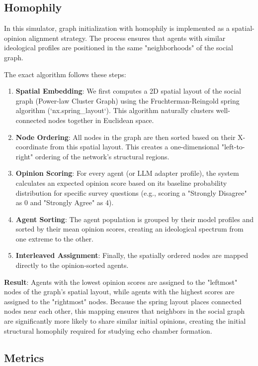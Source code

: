 \documentclass{article} %
\begin{document}
\subsection{Homophily}
\label{appendix_homophily}

In this simulator, graph initialization with homophily is implemented as a spatial-opinion alignment strategy. The process ensures that agents with similar ideological profiles are positioned in the same "neighborhoods" of the social graph.

The exact algorithm follows these steps:

\begin{enumerate}
    \item \textbf{Spatial Embedding}: We first computes a 2D spatial layout of the social graph (Power-law Cluster Graph) using the Fruchterman-Reingold spring algorithm (`nx.spring\_layout`). This algorithm naturally clusters well-connected nodes together in Euclidean space.
    \item \textbf{Node Ordering}: All nodes in the graph are then sorted based on their X-coordinate from this spatial layout. This creates a one-dimensional "left-to-right" ordering of the network's structural regions.
    \item \textbf{Opinion Scoring}: For every agent (or LLM adapter profile), the system calculates an expected opinion score based on its baseline probability distribution for specific survey questions (e.g., scoring a "Strongly Disagree" as 0 and "Strongly Agree" as 4).
    \item \textbf{Agent Sorting}: The agent population is grouped by their model profiles and sorted by their mean opinion scores, creating an ideological spectrum from one extreme to the other.
    \item \textbf{Interleaved Assignment}: Finally, the spatially ordered nodes are mapped directly to the opinion-sorted agents. 
\end{enumerate}

\textbf{Result}: Agents with the lowest opinion scores are assigned to the "leftmost" nodes of the graph's spatial layout, while agents with the highest scores are assigned to the "rightmost" nodes. Because the spring layout places connected nodes near each other, this mapping ensures that neighbors in the social graph are significantly more likely to share similar initial opinions, creating the initial structural homophily required for studying echo chamber formation.

\subsection{Metrics}
\label{appendix_metrics}
\end{document}
